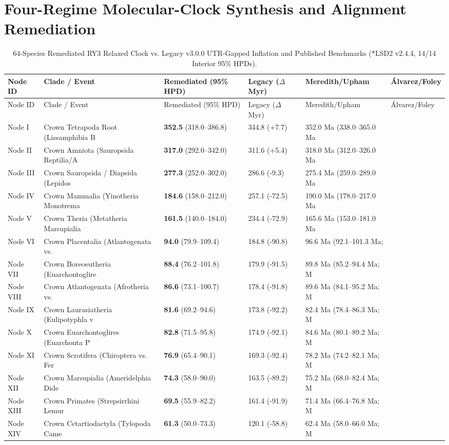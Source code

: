 \documentclass[10pt,letterpaper]{article}
\begin{document}
\section{Four-Regime Molecular-Clock Synthesis and Alignment Remediation}
\begin{longtable}{llllll}
\caption{64-Species Remediated RY3 Relaxed Clock vs. Legacy v3.0.0 UTR-Gapped Inflation and Published Benchmarks (*LSD2 v2.4.4, 14/14 Interior 95\% HPDs).} \\
\toprule
Node ID & Clade / Event & Remediated (95\% HPD) & Legacy ($\Delta$ Myr) & Meredith/Upham & \'{A}lvarez/Foley \\
\midrule
\endfirsthead
\toprule
Node ID & Clade / Event & Remediated (95\% HPD) & Legacy ($\Delta$ Myr) & Meredith/Upham & \'{A}lvarez/Foley \\
\midrule
\endhead
Node I & Crown Tetrapoda Root (Lissamphibia B & \textbf{352.5} (318.0--386.8) & 344.8 (+7.7) & 352.0 Ma (338.0–365.0 Ma &  \\
Node II & Crown Amniota (Sauropsida Reptilia/A & \textbf{317.0} (292.0--342.0) & 311.6 (+5.4) & 318.0 Ma (312.0–326.0 Ma &  \\
Node III & Crown Sauropsida / Diapsida (Lepidos & \textbf{277.3} (252.0--302.0) & 286.6 (-9.3) & 275.4 Ma (259.0–289.0 Ma &  \\
Node IV & Crown Mammalia (Yinotheria Monotrema & \textbf{184.6} (158.0--212.0) & 257.1 (-72.5) & 190.0 Ma (178.0–217.0 Ma &  \\
Node V & Crown Theria (Metatheria Marsupialia & \textbf{161.5} (140.0--184.0) & 234.4 (-72.9) & 165.6 Ma (153.0–181.0 Ma &  \\
Node VI & Crown Placentalia (Atlantogenata vs. & \textbf{94.0} (79.9--109.4) & 184.8 (-90.8) & 96.6 Ma (92.1–101.3 Ma;  &  \\
Node VII & Crown Boreoeutheria (Euarchontoglire & \textbf{88.4} (76.2--101.8) & 179.9 (-91.5) & 89.8 Ma (85.2–94.4 Ma; M &  \\
Node VIII & Crown Atlantogenata (Afrotheria vs.  & \textbf{86.6} (73.1--100.7) & 178.4 (-91.8) & 89.6 Ma (84.1–95.2 Ma; M &  \\
Node IX & Crown Laurasiatheria (Eulipotyphla v & \textbf{81.6} (69.2--94.6) & 173.8 (-92.2) & 82.4 Ma (78.4–86.3 Ma; M &  \\
Node X & Crown Euarchontoglires (Euarchonta P & \textbf{82.8} (71.5--95.8) & 174.9 (-92.1) & 84.6 Ma (80.1–89.2 Ma; M &  \\
Node XI & Crown Scrotifera (Chiroptera vs. Fer & \textbf{76.9} (65.4--90.1) & 169.3 (-92.4) & 78.2 Ma (74.2–82.1 Ma; M &  \\
Node XII & Crown Marsupialia (Ameridelphia Dide & \textbf{74.3} (58.0--90.0) & 163.5 (-89.2) & 75.2 Ma (68.0–82.4 Ma; M &  \\
Node XIII & Crown Primates (Strepsirrhini Lemur  & \textbf{69.5} (55.9--82.2) & 161.4 (-91.9) & 71.4 Ma (66.4–76.8 Ma; M &  \\
Node XIV & Crown Cetartiodactyla (Tylopoda Came & \textbf{61.3} (50.0--73.3) & 120.1 (-58.8) & 62.4 Ma (58.0–66.0 Ma; M &  \\
\bottomrule
\end{longtable}
\end{document}
